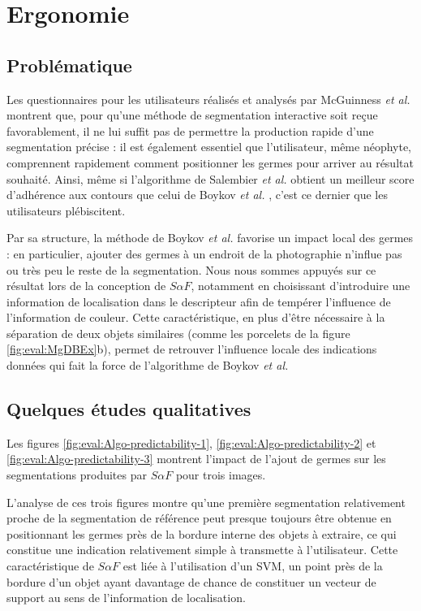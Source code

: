 \section{Ergonomie}
\label{sec:eval:ergonomie}

\subsection{Problématique}
Les questionnaires pour les utilisateurs réalisés et analysés par McGuinness \textit{et al.} \cite{mcguinness2010comparative} montrent que, pour qu'une méthode de segmentation interactive soit reçue favorablement, il ne lui suffit pas de permettre la production rapide d'une segmentation précise : il est également essentiel que l'utilisateur, même néophyte, comprennent rapidement comment positionner les germes pour arriver au résultat souhaité. Ainsi, même si l'algorithme de Salembier \textit{et al.} \cite{salembier2000binary} obtient un meilleur score d'adhérence aux contours que celui de Boykov \textit{et al.} \cite{boykov2001interactive}, c'est ce dernier que les utilisateurs plébiscitent.

Par sa structure, la méthode de Boykov \textit{et al.} favorise un impact local des germes : en particulier, ajouter des germes à un endroit de la photographie n'influe pas\modif{,} ou très peu\modif{,} le reste de la segmentation.
Nous nous sommes appuyés sur ce résultat lors de la conception de $S \alpha F$, notamment en choisissant d'introduire une information de localisation dans le descripteur afin de tempérer l'influence de l'information de couleur. Cette caractéristique, en plus d'être nécessaire à la séparation de deux objets similaires (comme les porcelets de la figure \ref{fig:eval:MgDBEx}b), permet de retrouver l'influence locale des indications données qui fait la force de l'algorithme de Boykov \textit{et al.}


\subsection{Quelques études qualitatives}

Les figures \ref{fig:eval:Algo-predictability-1}, \ref{fig:eval:Algo-predictability-2} et \ref{fig:eval:Algo-predictability-3} montrent l'impact de l'ajout de germes sur les segmentations produites par $S \alpha F$ pour trois images.

L'analyse de ces trois figures montre qu'une première segmentation relativement proche de la segmentation de référence peut presque toujours être obtenue en positionnant les germes près de la bordure interne des objets à extraire, ce qui constitue une indication relativement simple à transmette à l'utilisateur. Cette caractéristique de $S \alpha F$ est liée à l'utilisation d'un SVM, un point près de la bordure d'un objet ayant davantage de chance de constituer un vecteur de support au sens de l'information de localisation.

